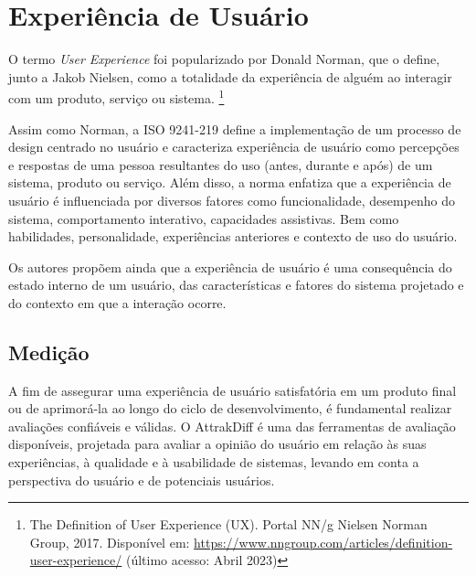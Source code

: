 \section{Experiência de Usuário}
\label{sec:Experiência de Usuário}

O termo \textit{User Experience} foi popularizado por Donald Norman, que o define, junto a Jakob Nielsen, como a totalidade da experiência de alguém ao interagir com um produto, 
serviço ou sistema. \footnote{The Definition of User Experience (UX). Portal NN/g Nielsen Norman Group, 2017. Disponível
em: \url{https://www.nngroup.com/articles/definition-user-experience/} (último acesso: Abril 2023)}

Assim como Norman, a ISO 9241-219 \cite{iso9241210} define a implementação de um processo de design centrado no usuário e caracteriza experiência de usuário como percepções e 
respostas de uma pessoa resultantes do uso (antes, durante e após) de um sistema, produto ou serviço. Além disso, a norma enfatiza que a experiência de usuário 
é influenciada por diversos fatores como funcionalidade, desempenho do sistema, comportamento interativo, capacidades assistivas. Bem como habilidades, 
personalidade, experiências anteriores e contexto de uso do usuário.

Os autores  propõem ainda que a experiência de usuário é uma consequência do estado interno de um usuário, das características e fatores do sistema projetado 
e do contexto em que a interação ocorre. 

\subsection{Medição}
\label{sec:Medição2}

A fim de assegurar uma experiência de usuário satisfatória em um produto final ou de aprimorá-la ao longo do ciclo de desenvolvimento, é fundamental realizar avaliações confiáveis e válidas. 
O AttrakDiff é uma das ferramentas de avaliação disponíveis, projetada para avaliar a opinião do usuário em relação às suas experiências, à qualidade e à usabilidade de sistemas, levando em 
conta a perspectiva do usuário e de potenciais usuários. 

